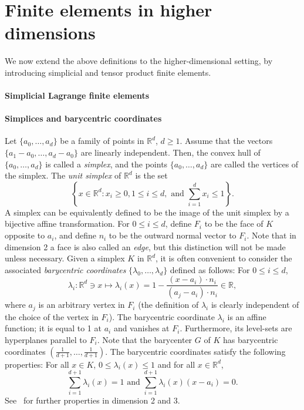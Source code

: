 \section{Finite elements in higher dimensions}\label{sec:finite-elements-high-dimensions}
We now extend the above definitions to the higher-dimensional setting, by introducing simplicial and tensor product finite elements.
\paragraph{Simplicial Lagrange finite elements}
\paragraph{Simplices and barycentric coordinates} Let $\{a_0, \dots, a_d\}$ be a family of points in $\mathbb{R}^d$, $d \ge 1$. Assume that the vectors $\{a_1 - a_0, \dots, a_d - a_0\}$ are linearly independent. Then, the convex hull of $\{a_0, \dots, a_d\}$ is called a \emph{simplex}, and the points $\{a_0, \dots, a_d\}$ are called the vertices of the simplex. The \emph{unit simplex} of $\mathbb{R}^d$ is the set
\begin{equation}
    \left\{x \in \mathbb{R}^d: x_i \ge 0, 1 \le i \le d, \text{ and } \sum_{i=1}^d x_i \le 1 \right\}.
\end{equation}
A simplex can be equivalently defined to be the image of the unit simplex by a bijective affine transformation. For $0 \le i \le d$, define $F_i$ to be the face of $K$ opposite to $a_i$, and define $n_i$ to be the outward normal vector to $F_i$. Note that in dimension 2 a face is also called an \emph{edge}, but this distinction will not be made unless necessary.
Given a simplex $K$ in $\mathbb{R}^d$, it is often convenient to consider the associated \emph{barycentric coordinates} $\{\lambda_0, \dots, \lambda_d\}$ defined as follows: For $0 \le i \le d$,
\begin{equation}\label{eq:barycentric_coords}
    \lambda_i: \mathbb{R}^d \ni x \mapsto \lambda_i(x) = 1 - \frac{(x - a_i) \cdot n_i}{(a_j - a_i) \cdot n_i} \in \mathbb{R},
\end{equation}
where $a_j$ is an arbitrary vertex in $F_i$ (the definition of $\lambda_i$ is clearly independent of the choice of the vertex in $F_i$). The barycentric coordinate $\lambda_i$ is an affine function; it is equal to 1 at $a_i$ and vanishes at $F_i$. Furthermore, its level-sets are hyperplanes parallel to $F_i$. Note that the barycenter $G$ of $K$ has barycentric coordinates $(\frac{1}{d+1}, \dots, \frac{1}{d+1})$. The barycentric coordinates satisfy the following properties: For all $x \in K$, $0 \le \lambda_i(x) \le 1$ and for all $x \in \mathbb{R}^d$,
\begin{equation}
    \sum_{i=1}^{d+1} \lambda_i(x) = 1 \text{ and } \sum_{i=1}^{d+1} \lambda_i(x) (x - a_i) = 0.
\end{equation}
See~\cite[Exercise 1.4]{ern2004theory} for further properties in dimension 2 and 3.

